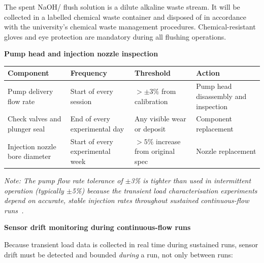 \documentclass[12pt]{article}
\begin{document}
\begin{tcolorbox}[
    colback=orange!8,
    colframe=orange!60!black,
    title={\textbf{Waste Disposal Note}},
    fonttitle=\bfseries
]
The spent NaOH/ flush solution is a dilute alkaline waste stream. It
will be collected in a labelled chemical waste container and disposed of in
accordance with the university's chemical waste management procedures.
Chemical-resistant gloves and eye protection are mandatory during all flushing
operations.
\end{tcolorbox}

\bigskip
\noindent\textbf{Pump head and injection nozzle inspection}

\medskip
\begin{tabularx}{\linewidth}{@{} >{\raggedright\arraybackslash}X
                                   >{\raggedright\arraybackslash}X
                                   >{\raggedright\arraybackslash}X
                                   >{\raggedright\arraybackslash}X @{}}
    \toprule
    \textbf{Component} & \textbf{Frequency} & \textbf{Threshold} & \textbf{Action} \\
    \midrule
    Pump delivery flow rate
        & Start of every session
        & $>{\pm}3\%$ from calibration
        & Pump head disassembly and inspection \\[4pt]
    Check valves and plunger seal
        & End of every experimental day
        & Any visible wear or deposit
        & Component replacement \\[4pt]
    Injection nozzle bore diameter
        & Start of every experimental week
        & $>5\%$ increase from original spec
        & Nozzle replacement \\
    \bottomrule
\end{tabularx}

\medskip
\noindent\textit{Note: The pump flow rate tolerance of $\pm$3\% is tighter than
used in intermittent operation (typically $\pm$5\%) because the transient load
characterisation experiments depend on accurate, stable injection rates throughout
sustained continuous-flow runs~\cite{levenspiel1999}.}

\bigskip
\noindent\textbf{Sensor drift monitoring during continuous-flow runs}

\medskip
Because transient load data is collected in real time during sustained runs, sensor
drift must be detected and bounded \textit{during} a run, not only between runs:
\end{document}
